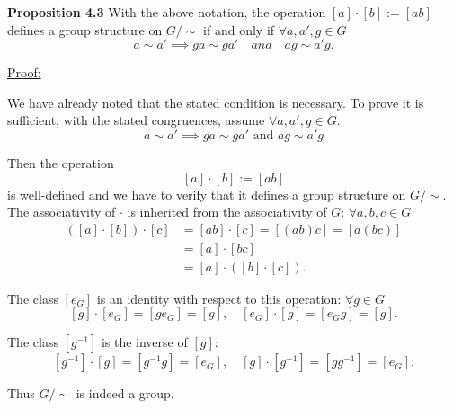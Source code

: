 \textbf{Proposition 4.3} With the above notation, the operation $[a]\cdot[b]:= [ab]$
defines a group structure on $G/\sim$ if and only if $\forall a, a', g \in G$
$$a \sim a' \implies ga \sim ga' \quad and \quad ag \sim a'g.$$

\underline{Proof:}

We have already noted that the stated condition is necessary. To prove it is sufficient, with the stated congruences, assume $\forall a, a', g \in G$.
$$a \sim a' \implies ga \sim ga' \text{ and } ag \sim a'g$$

Then the operation
$$[a] \cdot [b] := [ab]$$
is well-defined and we have to verify that it defines a group structure on $G/\sim$. The associativity of $\cdot$ is inherited from the associativity of $G$: $\forall a,b,c \in G$
\begin{align*}
([a] \cdot [b]) \cdot [c] & = [ab] \cdot [c] = [(ab)c] = [a(bc)] \\
&= [a] \cdot [bc] \\
&= [a] \cdot ([b] \cdot [c]).
\end{align*}

The class $[e_G]$ is an identity with respect to this operation: $\forall g \in G$
$$[g] \cdot [e_G] = [ge_G] = [g], \quad [e_G] \cdot [g] = [e_Gg] = [g].$$

The class $[g^{-1}]$ is the inverse of $[g]$:
$$[g^{-1}] \cdot [g] = [g^{-1}g] = [e_G], \quad [g] \cdot [g^{-1}] = [gg^{-1}] = [e_G].$$

Thus $G/\sim$ is indeed a group.